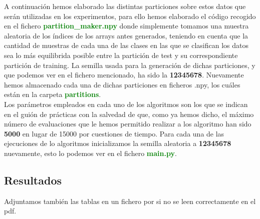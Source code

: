 \documentclass[10pt,a4paper]{article}
\begin{document}
A continuación hemos elaborado las distintas particiones sobre estos datos que serán utilizadas en los experimentos, para ello hemos elaborado el código recogido en el fichero \textbf{\textcolor{green}{partition\_maker.npy}} donde simplemente tomamos una muestra aleatoria de los índices de los arrays antes generados, teniendo en cuenta que la cantidad de muestras de cada una de las clases en las que se clasifican los datos sea lo más equilibrida posible entre la partición de test y su correspondiente partición de training. La semilla usada para la generación de dichas particiones, y que podemos ver en el fichero mencionado, ha sido la \textbf{12345678}. Nuevamente hemos almacenado cada una de dichas particiones en ficheros .npy, los cuáles están en la carpeta \textbf{\textcolor{green}{partitions}}.\\

Los parámetros empleados en cada uno de los algoritmos son los que se indican en el guión de prácticas con la salvedad de que, como ya hemos dicho, el máximo número de evaluaciones que le hemos permitido realizar a los algoritmo han sido \textbf{5000} en lugar de 15000 por cuestiones de tiempo. Para cada una de las ejecuciones de lo algoritmos inicializamos la semilla aleatoria a \textbf{12345678} nuevamente, esto lo podemos ver en el fichero \textbf{\textcolor{green}{main.py}}.\\


\subsection{\color[rgb]{0.0,0.0,0.51}Resultados}

Adjuntamos también las tablas en un fichero por si no se leen correctamente en el pdf.
\end{document}
